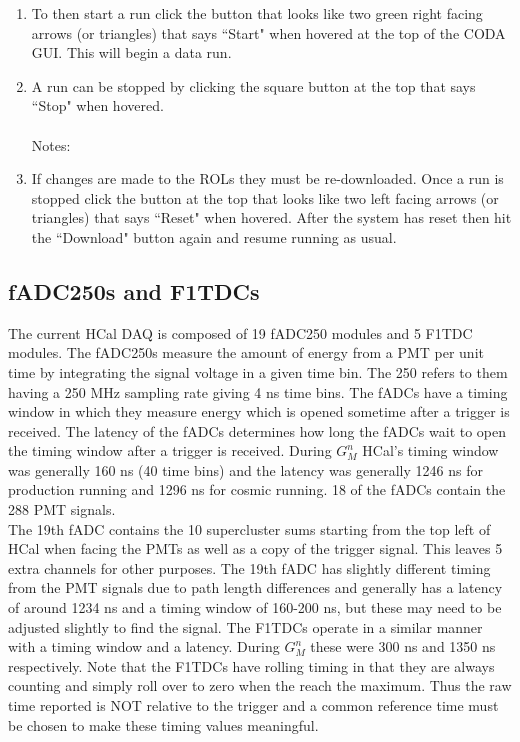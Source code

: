 \documentclass[oneside]{book}   %
\begin{document}
\begin{enumerate}
	\item To then start a run click the button that looks like two green right facing arrows (or triangles) that says ``Start" when hovered at the top of the CODA GUI. This will begin a data run.
	\item A run can be stopped by clicking the square button at the top that says ``Stop" when hovered.\\
	\\
	Notes:
	\item If changes are made to the ROLs they must be re-downloaded. Once a run is stopped click the button at the top that looks like two left facing arrows (or triangles) that says ``Reset" when hovered. After the system has reset then hit the ``Download" button again and resume running as usual.
\end{enumerate}

\subsection{fADC250s and F1TDCs}
\label{ssec:fadc250s_f1tdcs}

The current HCal DAQ is composed of 19 fADC250 modules and 5 F1TDC modules. The fADC250s measure the amount of energy from a PMT per unit time by integrating the signal voltage in a given time bin. The 250 refers to them having a 250 MHz sampling rate giving 4 ns time bins. The fADCs have a timing window in which they measure energy which is opened sometime after a trigger is received. The latency of the fADCs determines how long the fADCs wait to open the timing window after a trigger is received. During $G_M^n$ HCal's timing window was generally 160 ns (40 time bins) and the latency was generally 1246 ns for production running and 1296 ns for cosmic running. 18 of the fADCs contain the 288 PMT signals. \\

The 19th fADC contains the 10 supercluster sums starting from the top left of HCal when facing the PMTs as well as a copy of the trigger signal. This leaves 5 extra channels for other purposes. The 19th fADC has slightly different timing from the PMT signals due to path length differences and generally has a latency of around 1234 ns and a timing window of 160-200 ns, but these may need to be adjusted slightly to find the signal. The F1TDCs operate in a similar manner with a timing window and a latency. During $G_M^n$ these were 300 ns and 1350 ns respectively. Note that the F1TDCs have rolling timing in that they are always counting and simply roll over to zero when the reach the maximum. Thus the raw time reported is NOT relative to the trigger and a common reference time must be chosen to make these timing values meaningful. \\
\end{document}
